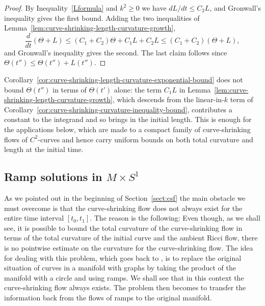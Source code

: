 \begin{proof}
By Inequality~\eqref{Lformula} and $k^2\ge0$ we have $dL/dt\le C_2L$, and
Gronwall's inequality gives the first bound. Adding the two inequalities of
Lemma~\ref{lem:curve-shrinking-length-curvature-growth},
$$\frac{d}{dt}(\Theta+L)\le (C_1+C_2)\Theta+C_1L+C_2L\le (C_1+C_2)(\Theta+L),$$
and Gronwall's inequality gives the second. The last claim follows since
$\Theta(t'')\le\Theta(t'')+L(t'')$.
\end{proof}

\begin{remark}
\label{rem:total-curvature-needs-initial-length}
Corollary~\ref{cor:curve-shrinking-length-curvature-exponential-bound} does not
bound $\Theta(t'')$ in terms of $\Theta(t')$ alone: the term $C_1L$ in
Lemma~\ref{lem:curve-shrinking-length-curvature-growth}, which descends from the
linear-in-$k$ term of
Corollary~\ref{cor:curve-shrinking-curvature-inequality-bound}, contributes a
constant to the integrand and so brings in the initial length. This is enough for
the applications below, which are made to a compact family of curve-shrinking
flows of $C^2$-curves and hence carry uniform bounds on both total curvature and
length at the initial time.
\end{remark}




\subsection{Ramp solutions in $ M\times S^1$}

As we pointed out in the beginning of Section~\ref{sect:csf} the
main obstacle we must overcome is that the curve-shrinking flow does
not always exist for the entire time interval $[t_0,t_1]$. The
reason is the following: Even though, as we shall see, it is
possible to bound the total curvature of the curve-shrinking flow in
terms of the total curvature of the initial curve and the ambient
Ricci flow, there is no pointwise estimate on the curvature for the
curve-shrinking flow. The idea for dealing with this problem, which
goes back to \cite{AG}, is to replace the original situation of
curves in a manifold with graphs by taking the product of the
manifold with a circle and using ramps. We shall see that in this
context the curve-shrinking flow always exists. The problem then
becomes to transfer the information back from the flows of ramps to
the original manifold.


